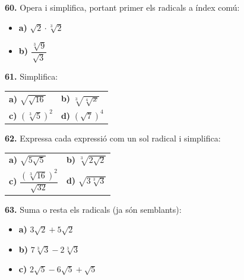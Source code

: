 \documentclass[13pt,a4paper]{extarticle}
\begin{document}
\par\noindent\begin{minipage}{\linewidth}
\textbf{60.} Opera i simplifica, portant primer els radicals a índex comú:\par

\begin{itemize}[leftmargin=0pt,itemsep=3pt,topsep=3pt,parsep=0pt,label={}]
\item \textbf{a)} $\sqrt{2}\cdot\sqrt[3]{2}$
\item \textbf{b)} $\dfrac{\sqrt[3]{9}}{\sqrt{3}}$
\end{itemize}
\end{minipage}\par\vspace{1.6mm}
\par\noindent\begin{minipage}{\linewidth}
\textbf{61.} Simplifica:\par

\begin{tabular}{@{}p{.46\linewidth}p{.46\linewidth}@{}}
\textbf{a)} $\sqrt{\sqrt{16}}$ & \textbf{b)} $\sqrt[3]{\sqrt[4]{x}}$ \\[2pt]
\textbf{c)} $\left(\sqrt[3]{5}\right)^2$ & \textbf{d)} $\left(\sqrt{7}\right)^4$ \\[2pt]
\end{tabular}\par
\end{minipage}\par\vspace{1.6mm}
\par\noindent\begin{minipage}{\linewidth}
\textbf{62.} Expressa cada expressió com un sol radical i simplifica:\par

\begin{tabular}{@{}p{.46\linewidth}p{.46\linewidth}@{}}
\textbf{a)} $\sqrt{5\sqrt{5}}$ & \textbf{b)} $\sqrt[3]{2\sqrt{2}}$ \\[2pt]
\textbf{c)} $\dfrac{\left(\sqrt[3]{16}\right)^2}{\sqrt{32}}$ & \textbf{d)} $\sqrt{3\sqrt[3]{3}}$ \\[2pt]
\end{tabular}\par
\end{minipage}\par\vspace{1.6mm}
\par\noindent\begin{minipage}{\linewidth}
\textbf{63.} Suma o resta els radicals (ja són semblants):\par

\begin{itemize}[leftmargin=0pt,itemsep=3pt,topsep=3pt,parsep=0pt,label={}]
\item \textbf{a)} $3\sqrt2+5\sqrt2$
\item \textbf{b)} $7\sqrt[3]{3}-2\sqrt[3]{3}$
\item \textbf{c)} $2\sqrt5-6\sqrt5+\sqrt5$
\end{itemize}
\end{minipage}\par\vspace{1.6mm}
\end{document}
